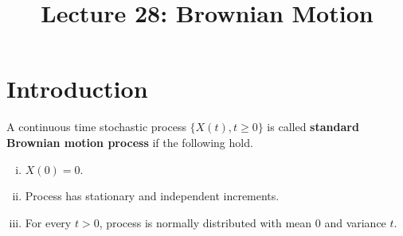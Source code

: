 \documentclass[a4paper,10pt,english]{article}
\title{Lecture 28: Brownian Motion}
\author{}
\begin{document}
\maketitle
\section{Introduction}
\begin{defn} A continuous time stochastic process $\{X(t), t \geqslant 0\}$ is called \textbf{standard Brownian motion process} if the following hold.
\begin{enumerate}[i)]
\item $X(0) = 0$.
\item Process has stationary and independent increments.
\item For every $t > 0$, process is normally distributed with mean $0$ and variance $t$.
\end{enumerate}
\end{defn}
\end{document}
